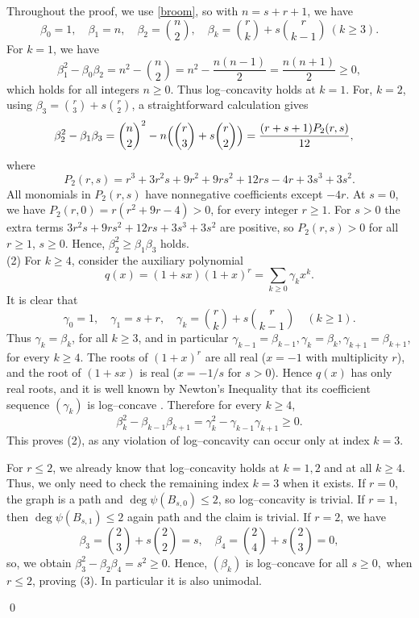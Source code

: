 \documentclass[12pt,twoside]{article}
\renewenvironment{proof}{{\noindent\bfseries Proof.}}{\qed}
\begin{document}
\begin{proof}
	Throughout the proof,  we use \eqref{broom}, so with $n=s+r+1$, we have
	\[
	\beta_0=1,\quad \beta_1=n,\quad \beta_2=\binom{n}{2},\quad
	\beta_k=\binom{r}{k}+s\binom{r}{k-1}\ (k\ge 3).
	\]
	For $k=1$, we have
	\[
	\beta_1^2 - \beta_0\beta_2
	= n^2 - \binom{n}{2}
	= n^2 - \frac{n(n-1)}{2}
	= \frac{n(n+1)}{2}\ge 0, 
	\]
	which holds for all integers $n\ge 0$. Thus log–concavity holds at $k=1$.
	For, $k=2$, using $\beta_3=\binom{r}{3}+s\binom{r}{2}$, a straightforward  calculation gives
	\begin{align*}
		\beta_2^2 - \beta_1\beta_3
		&= \binom{n}{2}^2 - n\Bigl(\binom{r}{3}+s\binom{r}{2}\Bigr) = \frac{(r+s+1) P_2(r,s)}{12},
	\end{align*}
	where
	\[
	P_2(r,s)
	= r^3 + 3r^2 s + 9r^2 + 9r s^2 + 12rs - 4r + 3s^3 + 3s^2.
	\]
	All monomials in $P_2(r,s)$ have nonnegative coefficients except $-4r$. At	$s=0$, we have $P_2(r,0) = r(r^2+9r-4)>0$, for every integer $r\ge 1$. For $s>0$ the extra terms
	$3r^2 s + 9rs^2 + 12rs + 3s^3 + 3s^2$ are positive, so $P_2(r,s)>0$ for all
	$r\ge 1$, $s\ge 0$. Hence, $\beta_2^2\ge \beta_1\beta_3$ holds.\\
	(2) For $k\ge 4$, consider the auxiliary polynomial
	\[
	q(x)=(1+sx)(1+x)^r = \sum_{k\ge 0} \gamma_k x^k.
	\]
	It is clear that
	\[
	\gamma_0=1,\quad \gamma_1=s+r,\quad
	\gamma_k=\binom{r}{k}+s\binom{r}{k-1}\quad(k\ge 1).
	\]
	Thus $\gamma_k=\beta_k$, for all $k\ge 3$, and in particular $\gamma_{k-1}=\beta_{k-1},
	\gamma_k=\beta_k,\gamma_{k+1}=\beta_{k+1}$, for every $k\ge 4$. The roots of $(1+x)^r$ are all real ($x=-1$ with multiplicity $r$), and the	root of $(1+sx)$ is real ($x=-1/s$ for $s>0$). Hence $q(x)$ has only real
	roots, and it is well known by Newton's Inequality that its coefficient sequence $(\gamma_k)$ is log–concave \cite{stanley, hardy}. Therefore for every $k\ge 4$,
	\[
	\beta_k^2 - \beta_{k-1}\beta_{k+1}
	= \gamma_k^2 - \gamma_{k-1}\gamma_{k+1}\ge 0.
	\]
	This proves (2), as any violation of log–concavity can occur only at index $k=3$.
	
	For  $r\le 2$, we already know that log–concavity holds at $k=1,2$ and at all $k\ge 4$. Thus, we only need to check the remaining index $k=3$ when it exists.	If $r=0$, the graph is a path and $\deg\psi(B_{s,0})\le 2$, so log–concavity is trivial. If $r=1$, then $\deg\psi(B_{s,1})\le 2$ again path and the claim is
	trivial. If $r=2$, we have
	\[
	\beta_3 = \binom{2}{3} + s\binom{2}{2} = s,\quad
	\beta_4 = \binom{2}{4} + s\binom{2}{3} = 0,
	\]
	so, we obtain $\beta_3^2 - \beta_2\beta_4 = s^2\ge 0.$ Hence, $(\beta_k)$ is log–concave for all $s\ge 0,$ when $r\le 2$, proving (3). In	particular it is also unimodal.
	

\end{proof}
\end{document}

